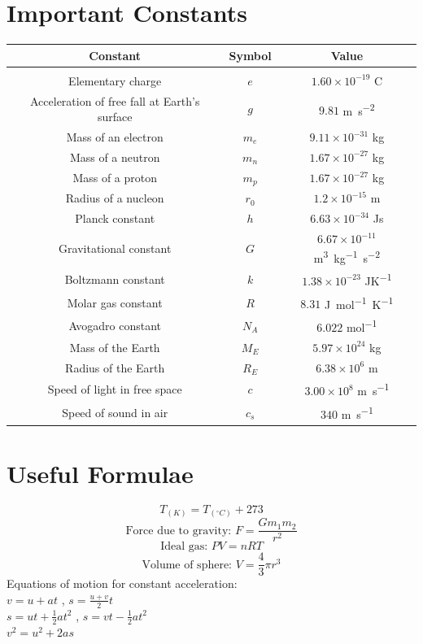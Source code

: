 \documentclass{exam}
\begin{document}
\section*{Important Constants}
\vspace{20pt}
\begin{tabular}{ c|c|c } 
    \textbf{Constant} & \textbf{Symbol} & \textbf{Value} \\ 
    \hline &&\\
    Elementary charge & $e$ & $1.60\times10^{-19}$ \si{C} \\
    Acceleration of free fall at Earth's surface & $g$ & $9.81$ \si{m.s^{-2}} \\
    Mass of an electron & $m_e$ & $9.11\times10^{-31}$ \si{kg} \\
    Mass of a neutron & $m_n$ & $1.67\times10^{-27}$ \si{kg} \\
    Mass of a proton & $m_p$ & $1.67\times10^{-27}$ \si{kg} \\
    Radius of a nucleon & $r_0$ & $1.2\times10^{-15}$ \si{m} \\
    Planck constant & $h$ & $6.63\times10^{-34}$ \si{Js} \\
    Gravitational constant & $G$ & $6.67\times10^{-11}$ \si{m^3.kg^{-1}.s^{-2}} \\
    Boltzmann constant & $k$ & $1.38\times10^{-23}$ \si{JK^{-1}} \\
    Molar gas constant & $R$ & $8.31$ \si{J.mol^{-1}.K^{-1}} \\
    Avogadro constant & $N_A$ & $6.022$ \si{mol^{-1}} \\
    Mass of the Earth & $M_E$ & $5.97\times10^{24}$ \si{kg} \\
    Radius of the Earth & $R_E$ & $6.38\times10^6$ \si{m} \\
    Speed of light in free space & $c$ & $3.00\times 10^8 $ \si{m.s^{-1}} \\
    Speed of sound in air & $c_s$ & $340$ \si{m.s^{-1}} \\
\end{tabular}

\newpage\centering
\section*{Useful Formulae}
$$ T_{(K)} = T_{(^\circ C)} + 273 $$
$$ \text{Force due to gravity: } F = \frac{Gm_1m_2}{r^2} $$
$$ \text{Ideal gas: } PV = nRT $$
$$ \text{Volume of sphere: } V = \frac{4}{3} \pi r^3 $$
\vspace{5pt}
Equations of motion for constant acceleration:\\
$v = u+at$ , $s = \frac{u+v}{2}t$\\
\vspace{5pt}
$s = ut + \frac{1}{2}at^2$ , $s = vt - \frac{1}{2}at^2$\\
\vspace{5pt}
$v^2 = u^2 + 2as$\\
\end{document}
